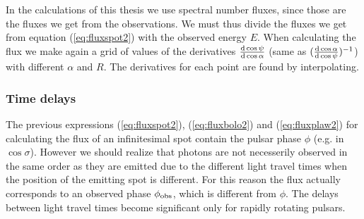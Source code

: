 \documentclass{wihuri}
\def\msun{{\rm M_{\odot}}}
\def\d{{\rm d}}
\def\phiobs{\phi_{\rm obs}}
\begin{document}
In the calculations of this thesis we use spectral number fluxes, since those are the fluxes we get from the observations. We must thus divide the fluxes we get from equation (\ref{eq:fluxspot2}) with the observed energy $E$. When calculating the flux we make again a grid of values of the derivatives $\frac{\d\cos\psi}{\d\cos\alpha}$ (same as $(\frac{\d\cos\alpha}{\d\cos\psi})^{-1}$) with different $\alpha$ and $R$. The derivatives for each point are found by interpolating. 


\subsubsection{Time delays}



The previous expressions (\ref{eq:fluxspot2}), (\ref{eq:fluxbolo2}) and (\ref{eq:fluxplaw2}) for calculating the flux of an infinitesimal spot
contain the pulsar phase $\phi$ (e.g. in $\cos\sigma$). However we should realize that photons are not necesserily observed in the same order as they are emitted due to the different light travel times when the position of the emitting spot is different. For this reason the flux actually corresponds to an observed phase $\phiobs$, which is different from $\phi$. The delays between light travel times become significant only for rapidly rotating pulsars. %

   
\end{document}
